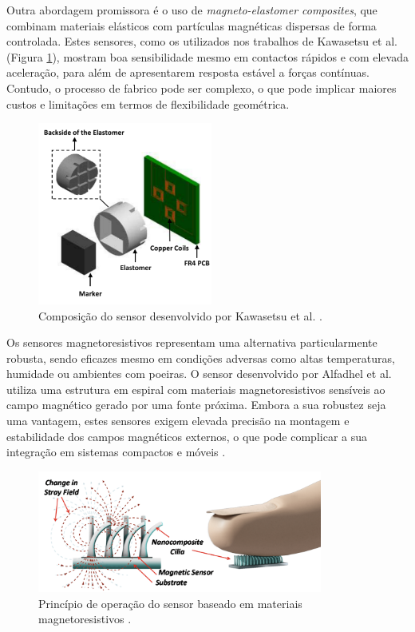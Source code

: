 Outra abordagem promissora é o uso de \textit{magneto-elastomer composites}, que combinam materiais elásticos com partículas magnéticas dispersas de forma controlada. Estes sensores, como os utilizados nos trabalhos de Kawasetsu et al. \cite{Kawasetsu2018} (Figura \ref{fig:imagem5}), mostram boa sensibilidade mesmo em contactos rápidos e com elevada aceleração, para além de apresentarem resposta estável a forças contínuas. Contudo, o processo de fabrico pode ser complexo, o que pode implicar maiores custos e limitações em termos de flexibilidade geométrica.

\begin{figure}[H]
\centering
\includegraphics[height=6cm,keepaspectratio]{figs/chapter2/magneto-elastomer.png}
\caption{Composição do sensor desenvolvido por Kawasetsu et al. \cite{Kawasetsu2018}.}
\label{fig:imagem5}
\end{figure}

Os sensores magnetoresistivos representam uma alternativa particularmente robusta, sendo eficazes mesmo em condições adversas como altas temperaturas, humidade ou ambientes com poeiras. O sensor desenvolvido por Alfadhel et al.\cite{Alfadhel2016} utiliza uma estrutura em espiral com materiais magnetoresistivos sensíveis ao campo magnético gerado por uma fonte próxima. Embora a sua robustez seja uma vantagem, estes sensores exigem elevada precisão na montagem e estabilidade dos campos magnéticos externos, o que pode complicar a sua integração em sistemas compactos e móveis \cite{Yang2022}.

\begin{figure}[H]
\centering
\includegraphics[height=4cm,keepaspectratio]{figs/chapter2/magneto_resistive.png}
\caption{Princípio de operação do sensor baseado em materiais magnetoresistivos \cite{Alfadhel2016}.}
\label{fig:img7}
\end{figure}

